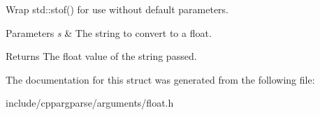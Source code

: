 Wrap std\+::stof() for use without default parameters. 


\begin{DoxyParams}{Parameters}
{\em s} & The string to convert to a float.\\
\hline
\end{DoxyParams}
\begin{DoxyReturn}{Returns}
The float value of the string passed. 
\end{DoxyReturn}


The documentation for this struct was generated from the following file\+:\begin{DoxyCompactItemize}
\item 
include/cppargparse/arguments/float.\+h\end{DoxyCompactItemize}
